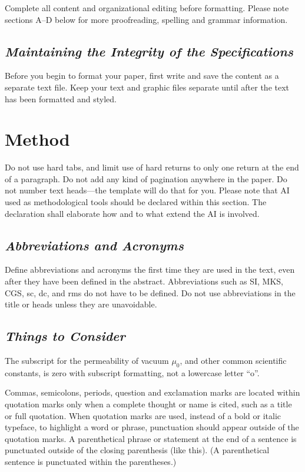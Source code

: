 \documentclass[10pt,conference,a4paper]{IEEEtran}
\let\oldsection\section
\let\oldsubsection\subsection
\renewcommand{\section}[1]{%
    \oldsection{#1}%
    \vspace{-4pt} %
}
\renewcommand{\subsection}[1]{%
    \oldsubsection{\textit{#1}}%
    \vspace{-3pt} %
}
\begin{document}
Complete all content and organizational editing before formatting. Please note sections A--D below for more proofreading, spelling and grammar information.

\subsection{Maintaining the Integrity of the Specifications}

Before you begin to format your paper, first write and save the content as a separate text file. Keep your text and graphic files separate until after the text has been formatted and styled.

\section{Method}

Do not use hard tabs, and limit use of hard returns to only one return at the end of a paragraph. Do not add any kind of pagination anywhere in the paper. Do not number text heads---the template will do that for you. Please note that AI used as methodological tools should be declared within this section. The declaration shall elaborate how and to what extend the AI is involved.

\subsection{Abbreviations and Acronyms}

Define abbreviations and acronyms the first time they are used in the text, even after they have been defined in the abstract. Abbreviations such as SI, MKS, CGS, sc, dc, and rms do not have to be defined. Do not use abbreviations in the title or heads unless they are unavoidable.

\subsection{Things to Consider}

The subscript for the permeability of vacuum $\mu_0$, and other common scientific constants, is zero with subscript formatting, not a lowercase letter ``o''.

Commas, semicolons, periods, question and exclamation marks are located within quotation marks only when a complete thought or name is cited, such as a title or full quotation. When quotation marks are used, instead of a bold or italic typeface, to highlight a word or phrase, punctuation should appear outside of the quotation marks. A parenthetical phrase or statement at the end of a sentence is punctuated outside of the closing parenthesis (like this). (A parenthetical sentence is punctuated within the parentheses.)
\end{document}
